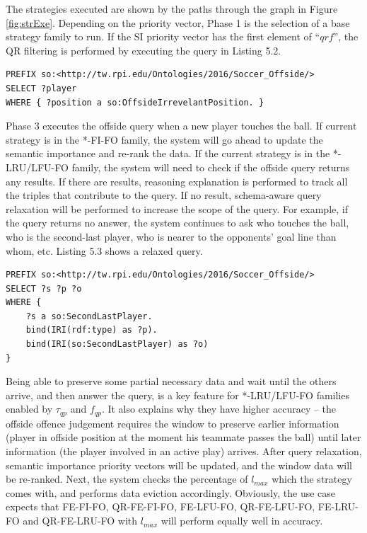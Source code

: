 The strategies executed are shown by the paths through the graph in Figure \ref{fig:strExe}. 
Depending on the priority vector, Phase 1 is the selection of a base strategy family to run. 
If the SI priority vector has the first element of ``$qrf$'', the QR filtering is performed by executing the query in Listing 5.2.

\begin{lstlisting}[language=SPARQL,caption={Query Relevance Filtering Query},basicstyle=\small,frame=single]
PREFIX so:<http://tw.rpi.edu/Ontologies/2016/Soccer_Offside/>
SELECT ?player 
WHERE { ?position a so:OffsideIrrevelantPosition. }
\end{lstlisting}

Phase 3 executes the offside query when a new player touches the ball.
If current strategy is in the *-FI-FO family, the system will go ahead to update the semantic importance and re-rank the data. 
If the current strategy is in the *-LRU/LFU-FO family, the system will need to check if the offside query returns any results.
If there are results, reasoning explanation is performed to track all the triples that contribute to the query.
If no result, schema-aware query relaxation \cite{hurtado2008query} will be performed to increase the scope of the query.
For example, if the query returns no answer, the system continues to ask who touches the ball, who is the second-last player, who is nearer to the opponents' goal line than whom, etc. 
Listing 5.3 shows a relaxed query.

\begin{lstlisting}[language=SPARQL,caption={A Relaxed Query Example},basicstyle=\small,frame=single]
PREFIX so:<http://tw.rpi.edu/Ontologies/2016/Soccer_Offside/>
SELECT ?s ?p ?o
WHERE {
	?s a so:SecondLastPlayer.
	bind(IRI(rdf:type) as ?p).
	bind(IRI(so:SecondLastPlayer) as ?o)
}
\end{lstlisting}

Being able to preserve some partial necessary data and wait until the others arrive, and then answer the query, is a key feature for *-LRU/LFU-FO families enabled by $\tau_{qp}$ and $f_{qp}$.
It also explains why they have higher accuracy -- the offside offence judgement requires the window to preserve earlier information (player in offside position at the moment his teammate passes the ball) until later information (the player involved in an active play) arrives.
After query relaxation, semantic importance priority vectors will be updated, and the window data will be re-ranked. 
Next, the system checks the percentage of $l_{max}$ which the strategy comes with, and performs data eviction accordingly. 
Obviously, the use case expects that FE-FI-FO, QR-FE-FI-FO, FE-LFU-FO, QR-FE-LFU-FO, FE-LRU-FO and QR-FE-LRU-FO with $l_{max}$ will perform equally well in accuracy. 
%
